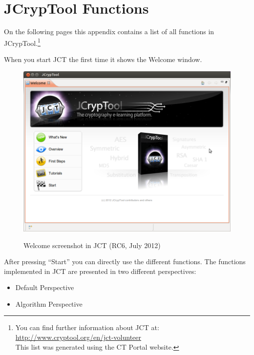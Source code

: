 \section{JCrypTool Functions}
\label{s:appendix-function-overview-JCT}

\noindent On the following pages this appendix contains a list of all
functions in JCrypTool.\footnote{%
  You can find further information about JCT at:
  \url{http://www.cryptool.org/en/jct-volunteer} \\
  This list was generated using the CT Portal website.}

\noindent When you start JCT the first time it shows the Welcome window.

\begin{figure}[hb]
\begin{center}
\includegraphics[scale=0.45, angle=0] {figures/JCT-Welcome-EN}
\hypertarget{Welcome-Screenshot-JCT}{}
\caption{Welcome screenshot in JCT (RC6, July 2012)} 
\label{Welcome-Screenshot-JCT}
\end{center}
\end{figure}
After pressing ``Start'' you can directly use the different functions.
The functions implemented in JCT are presented in two different perspectives:
\begin{itemize}
   \item Default Perspective
   \item Algorithm Perspective
 \end{itemize}

